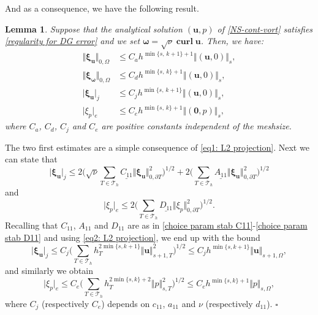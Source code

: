 \documentclass[reqno,a4paper]{article}
\numberwithin{equation}{section}
\newcommand\bu{\boldsymbol{u}}
\newcommand\cT{\mathcal{T}}
\renewcommand\O{\Omega}
\newcommand\bomega{\boldsymbol{\omega}}
\newcommand\bxi{\boldsymbol{\xi}}
\newtheorem{lemma}{Lemma}[section]
\newcommand\curl{\mathop{\mathbf{curl}}\nolimits}
\newenvironment{proof}{\noindent{\it Proof.}}{\hfill$\square$}
\begin{document}
And as a consequence, we have the following result.
\begin{lemma}\label{numerical-error bounds DG}
 Suppose that the analytical solution $(\bu,p)$ of \eqref{NS-cont-vort}
 satisfies \eqref{regularity for DG error} and we set $\bomega=\sqrt{\nu}\curl \bu$. Then, we have:
  \begin{align*}
 \Vert\bxi_{\bu}\Vert_{0,\O}&\leq  C_{a} h^{\min\{s,\,k+1\}+1}\Vert(\bu,0)\Vert_{s},\\
    \Vert\bxi_{\bomega}\Vert_{0,\O}&\leq  C_{d} h^{\min\{s,\,k\}+1}\Vert(\bu,0)\Vert_{s},\\
    \vert\bxi_{\bu}\vert_{j}&\leq C_{j} h^{\min\{s,\,k+1\}}\Vert(\bu,0)\Vert_{s},\\
 \vert\xi_{p}\vert_{e}&\leq  C_{e} h^{\min\{s,\,k\}+1}\Vert(\mathbf{0},p)\Vert_{s},
   \end{align*}
where $C_{a}$, $C_{d}$, $C_{j}$ and $C_{e}$ are positive constants independent of the meshsize.
\end{lemma}
%
\begin{proof}
The two first estimates are a simple consequence
of \eqref{eq1: L2 projection}. Next we can state that 
\begin{equation*}
 \vert\bxi_{\bu}\vert_{j} \leq 2\big(\sqrt{\nu}\sum_{T\in\cT_h}\underline{C_{11}} \Vert\bxi_{\bu}\Vert_{0,\partial T}^{2}\big)^{1/2}+2\big(\sum_{T\in\cT_h}\underline{A_{11}} \Vert\bxi_{\bu}\Vert_{0,\partial T}^{2}\big)^{1/2}
 \end{equation*}
 and 
 \begin{equation*}
 \vert\xi_{p}\vert_{e} \leq 2\big(\sum_{T\in\cT_h}\underline{D_{11}} \Vert\xi_{p}\Vert_{0,\partial T}^{2}\big)^{1/2}.
\end{equation*}
Recalling that $C_{11}$, $A_{11}$ and $D_{11}$ are as in \eqref{choice param stab C11}-\eqref{choice param stab D11} and using \eqref{eq2: L2 projection}, we end up with the bound
 \begin{equation*}
 \vert\bxi_{\bu}\vert_{j} \leq C_j\big(\sum_{T\in\cT_h}h_T^{2\min \{s,k+1\}}
 \Vert{\bu}\Vert_{s+1,T}^{2}\big)^{1/2}
 \leq C_j h^{\min\{s,k+1\}}\Vert{\bu}\Vert_{s+1,\O}, 
\end{equation*}
and similarly we obtain
\begin{equation*}
  \vert \xi_{p}\vert_{e} \leq C_e\big(\sum_{T\in\cT_h}h_T^{2\min \{s,k\}+2}\Vert{p}\Vert_{s,T}^{2}\big)^{1/2}
  \leq C_e h^{\min\{s,k\}+1}\Vert{p}\Vert_{s,\O},
\end{equation*}
where $C_j$ (respectively $C_e$) depends on $c_{11} $, $a_{11}$ and $\nu$ (respectively $d_{11}$).
\end{proof}
\end{document}
